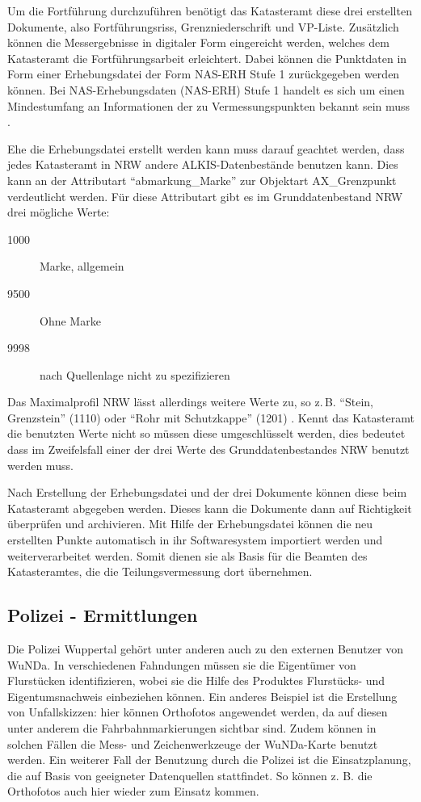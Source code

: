 Um die Fortführung durchzuführen benötigt das Katasteramt diese drei erstellten Dokumente, also Fortführungsriss, Grenzniederschrift und \ac{VP-Liste}.
Zusätzlich können die Messergebnisse in digitaler Form eingereicht werden, welches dem Katasteramt die Fortführungsarbeit erleichtert. Dabei können die Punktdaten in Form einer Erhebungsdatei der Form NAS-ERH Stufe 1 zurückgegeben werden können.
Bei NAS-Erhebungsdaten (NAS-ERH) Stufe 1 handelt es sich um einen Mindestumfang an Informationen der zu Vermessungspunkten bekannt sein muss \autocite[vgl.][]{bezk-nas-erh}.

Ehe die Erhebungsdatei erstellt werden kann muss darauf geachtet werden, dass jedes Katasteramt in \ac{NRW} andere ALKIS-Datenbestände benutzen kann. Dies kann an der Attributart "`abmarkung\_Marke"' zur Objektart AX\_Grenzpunkt verdeutlicht werden. Für diese Attributart gibt es im  Grunddatenbestand NRW drei mögliche Werte:
\begin{description}
\item[1000] Marke, allgemein
\item[9500] Ohne Marke
\item[9998] nach Quellenlage nicht zu spezifizieren 
\end{description}
Das Maximalprofil NRW lässt allerdings weitere Werte zu, so z.\,B. "`Stein, Grenzstein"' (1110) oder "`Rohr mit Schutzkappe"' (1201) \autocite[vgl.][]{bezk-schluessel}. Kennt das Katasteramt die benutzten Werte nicht so müssen diese umgeschlüsselt werden, dies bedeutet dass im Zweifelsfall einer der drei Werte des Grunddatenbestandes NRW benutzt werden muss. 

Nach Erstellung der Erhebungsdatei und der drei Dokumente können diese beim Katasteramt abgegeben werden. Dieses kann die Dokumente dann auf Richtigkeit überprüfen und archivieren.
Mit Hilfe der Erhebungsdatei können die neu erstellten Punkte automatisch in ihr Softwaresystem importiert werden und weiterverarbeitet werden.
Somit dienen sie als Basis für die Beamten des Katasteramtes, die die Teilungsvermessung dort übernehmen.

\subsection{Polizei - Ermittlungen} \label{subsec:polizei_ermittlung}
Die Polizei Wuppertal gehört unter anderen auch zu den externen Benutzer von \ac{WuNDa}.
In verschiedenen Fahndungen müssen sie die Eigentümer von Flurstücken identifizieren, wobei sie die Hilfe des Produktes Flurstücks- und Eigentumsnachweis einbeziehen können.
Ein anderes Beispiel ist die Erstellung von Unfallskizzen: hier können Orthofotos angewendet werden, da auf diesen unter anderem die Fahrbahnmarkierungen sichtbar sind. Zudem können in solchen Fällen die Mess- und Zeichenwerkzeuge der \ac{WuNDa}-Karte benutzt werden. Ein weiterer Fall der Benutzung durch die Polizei ist die Einsatzplanung, die auf Basis von geeigneter Datenquellen stattfindet. So können z. B. die Orthofotos auch hier wieder zum Einsatz kommen.

